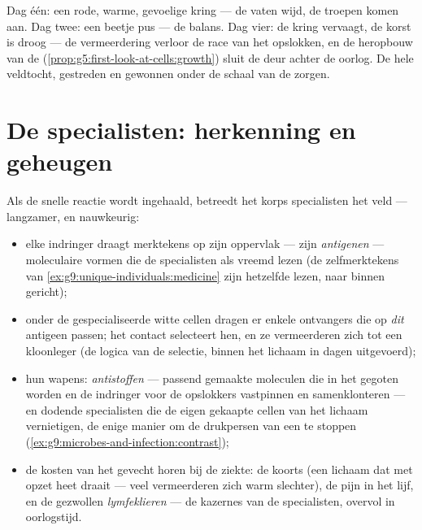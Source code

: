 \begin{example}\label{ex:g9:immune-defenses:cut}
Dag één: een rode, warme, gevoelige kring --- de vaten wijd, de
troepen komen aan. Dag twee: een beetje pus --- de balans. Dag
vier: de kring vervaagt, de korst is droog --- de vermeerdering
verloor de race van het opslokken, en de heropbouw van de 
(\cref{prop:g5:first-look-at-cells:growth}) sluit de deur achter de
oorlog. De hele veldtocht, gestreden en gewonnen onder de schaal
van de zorgen.
\end{example}

\section{De specialisten: herkenning en geheugen}

\begin{proposition}\label{prop:g9:immune-defenses:specific}
Als de snelle reactie wordt ingehaald, betreedt het korps
specialisten het veld --- langzamer, en nauwkeurig:
\begin{itemize}
  \item elke indringer draagt merktekens op zijn oppervlak --- zijn
        \emph{antigenen} --- moleculaire vormen
        die de specialisten als vreemd lezen (de zelfmerktekens
        van \cref{ex:g9:unique-individuals:medicine} zijn hetzelfde
        lezen, naar binnen gericht);
  \item onder de gespecialiseerde witte cellen dragen er enkele
        ontvangers die op \emph{dit} antigeen passen; het contact
        selecteert hen, en ze vermeerderen zich tot een
        kloonleger (de logica van de selectie, binnen het lichaam
        in dagen uitgevoerd);
  \item hun wapens: \emph{antistoffen} --- passend
        gemaakte moleculen die in het  gegoten worden en de
        indringer voor de opslokkers vastpinnen en samenklonteren
        --- en dodende specialisten die de eigen gekaapte cellen
        van het lichaam vernietigen, de enige manier om de
        drukpersen van een  te stoppen
        (\cref{ex:g9:microbes-and-infection:contrast});
  \item de kosten van het gevecht horen bij de ziekte: de koorts
        (een lichaam dat met opzet heet draait --- veel
         vermeerderen zich warm slechter), de pijn
        in het lijf, en de gezwollen \emph{lymfeklieren} --- de
        kazernes van de specialisten, overvol in oorlogstijd.
\end{itemize}
\end{proposition}
\admitted

